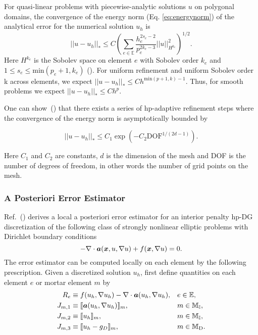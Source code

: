  For quasi-linear problems with piecewise-analytic solutions $u$ on polygonal domains, the convergence of the energy norm (Eq. \ref{eq:energynorm}) of the analytical error for the numerical solution $u_h$ is
% 
 \begin{equation}
 \label{eq:expectedconvergence}
 || u - u_h ||_* \leq C\left( \sum\limits_{e \in \mathbb{E}} \frac{ h_e^{2s_e - 2}}{ p_e^{2k_e -3}} ||u||^2_{H^{k_e}} \right)^{1/2}.
 \end{equation}
%
 Here ${H^{k_{e}}}$ is the Sobolev space on element $e$ with Sobolev order $k_{e}$ and $1 \leq s_{e} \leq \text{min}(p_{e}+1, k_{e})$ (\cite{houston2007energy, houston2008posteriori,houston2005discontinuous, bi2015posteriori}). For uniform refinement and uniform Sobolev order k across elements, we expect $|| u - u_h ||_* \leq Ch^{\text{min}(p+1, k) - 1}$. Thus, for smooth problems we expect $|| u - u_h ||_* \leq Ch^{p}$.

 One can show~(\cite{schotzau2014exponential}) that there exists a series of hp-adaptive refinement steps where the convergence of the energy norm is asymptotically bounded by
 
  \begin{equation}
 \label{eq:expconvergence}
 ||u-u_{h}||_{*} \leq C_{1}\exp(-C_{2}\text{DOF}^{1/(2d-1)}). 
\end{equation}

Here $C_{1}$ and $C_{2}$ are constants, $d$ is the dimension of the mesh and DOF is the number of degrees of freedom, in other words the number of grid points on the mesh.


\subsubsection{A Posteriori Error Estimator}

 Ref.~(\cite{bi2015posteriori}) derives a local a posteriori
error estimator for an interior penalty hp-DG discretization of the
following class of strongly nonlinear elliptic problems with Dirichlet
boundary conditions
%
\begin{equation}
\label{eq:classofproblems}
-\nabla \cdot \boldsymbol{a}(\boldsymbol{x}, u, \nabla u) + f(\boldsymbol{x},\nabla u) = 0 .
\end{equation}
%
The error estimator can be computed locally on each element by the
following prescription.  Given a discretized solution $u_h$, first define  quantities on each element $e$ or mortar element $m$ by
%
\begin{subequations}
\label{eq:Eta2_Ingredients}
\begin{align}
R_{e} &\equiv f(u_{h}, \nabla u_{h}) - \nabla \cdot \boldsymbol{a}(u_{h}, \nabla u_{h}),
&& e\in \mathbb{E},\\
     J_{m,1} &\equiv \llbracket \boldsymbol{a}(u_{h}, \nabla u_{h}) \rrbracket_{m},
&&     m\in \mathbb{M_I},\\
     J_{m,2} &\equiv \llbracket u_h \rrbracket_{m},
     &&     m\in \mathbb{M_I},\\
     J_{m,3} &\equiv \llbracket  u_{h} - g_D \rrbracket_{m},
     &&     m\in \mathbb{M}_{\rm D}.
\end{align}
\end{subequations}

